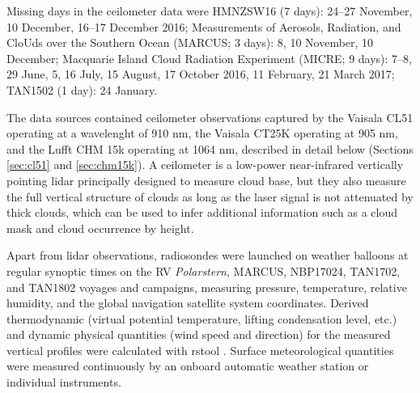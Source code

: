 \documentclass[12pt,a4paper]{article}
\begin{document}
Missing days in the ceilometer data were HMNZSW16 (7 days): 24--27 November, 10
December, 16--17 December 2016; Measurements of Aerosols, Radiation, and CloUds
over the Southern Ocean (MARCUS;  3 days): 8, 10 November, 10 December;
Macquarie Island Cloud Radiation Experiment (MICRE; 9 days): 7--8, 29 June, 5,
16 July, 15 August, 17 October 2016, 11 February, 21 March 2017; TAN1502 (1
day): 24 January.

The data sources contained ceilometer observations captured by the Vaisala CL51
operating at a wavelenght of 910 nm, the Vaisala CT25K operating at 905 nm, and
the Lufft CHM 15k operating at 1064 nm, described in detail below (Sections
\ref{sec:cl51} and \ref{sec:chm15k}). A ceilometer is a low-power near-infrared
vertically pointing lidar principally designed to  measure cloud base, but they 
also measure the full vertical structure of clouds as long as the laser signal
is not attenuated by thick clouds, which can be used to infer additional
information such as a cloud mask and cloud occurrence by height.

Apart from lidar observations, radiosondes were launched on weather balloons at
regular synoptic times on the RV \emph{Polarstern}, MARCUS, NBP17024, TAN1702,
and TAN1802 voyages and campaigns, measuring pressure, temperature, relative
humidity, and the global navigation satellite system coordinates. Derived
thermodynamic (virtual potential temperature, lifting condensation level, etc.)
and dynamic physical quantities (wind speed and direction) for the measured
vertical profiles were calculated with rstool \citep{rstool}. Surface
meteorological quantities were measured continuously by an onboard automatic
weather station or individual instruments.
\end{document}
